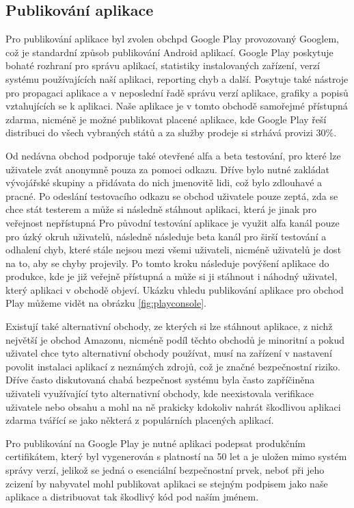 \documentclass{article}
\begin{document}
\subsection{Publikování aplikace}
Pro publikování aplikace byl zvolen obchpd Google Play provozovaný Googlem, což je standardní způsob
publikování Android aplikací. Google Play poskytuje bohaté rozhraní pro správu aplikací, statistiky
instalovaných zařízení, verzí systému používajících naší aplikaci, reporting chyb a další. Posytuje také
nástroje pro propagaci aplikace a v neposlední řadě správu verzí aplikace, grafiky a popisů
vztahujících se k aplikaci. Naše aplikace je v tomto obchodě samořejmé přístupná zdarma, nicméně
je možné publikovat placené aplikace, kde Google Play řeší distribuci do všech vybraných států a za služby
prodeje si strhává provizi 30\%.

Od nedávna obchod podporuje také otevřené alfa a beta testování, pro které lze uživatele zvát anonymně
pouza za pomoci odkazu. Dříve bylo nutné zakládat vývojářské skupiny a přidávata do nich jmenovitě
lidi, což bylo zdlouhavé a pracné. Po odeslání testovacího odkazu se obchod uživatele pouze zeptá,
zda se chce stát testerem a může si následně stáhnout aplikaci, která je jinak pro veřejnost nepřístupná
Pro původní testování aplikace je využit alfa kanál pouze pro úzký okruh uživatelů, následně následuje beta
kanál pro širší testování a odhalení chyb, které stále nejsou mezi všemi uživateli, nicméně uživatelů je
dost na to, aby se chyby projevily. Po tomto kroku následuje povýšení aplikace do produkce, kde je již
veřejně přístupná a může si ji stáhnout i náhodný uživatel, který aplikaci v obchodě objeví. Ukázku
vhledu publikování aplikace pro obchod Play můžeme vidět na obrázku \ref{fig:playconsole}.

Existují také alternativní obchody, ze kterých si lze stáhnout aplikace, z nichž největší je obchod Amazonu,
nicméně podíl těchto obchodů je minoritní a pokud uživatel chce tyto alternativní obchody používat,
musí na zařízení v nastavení povolit instalaci aplikací z neznámých zdrojů, což je značné bezpečnostní
riziko. Dříve často diskutovaná chabá bezpečnost systému byla často zapříčiněna uživateli využívající
tyto alternativní obchody, kde neexistovala verifikace uživatele nebo obsahu a mohl na ně prakicky
kdokoliv nahrát škodlivou aplikaci zdarma tvářící se jako některá z populárních placených aplikací.

Pro publikování na Google Play je nutné aplikaci podepsat produkčním certifikátem, který byl
vygenerován s platností na 50 let a je uložen mimo systém správy verzí, jelikož se jedná o esenciální
bezpečnostní prvek, neboť při jeho zcizení by nabyvatel mohl publikovat aplikaci se stejným podpisem
jako naše aplikace a distribuovat tak škodlivý kód pod naším jménem.
\end{document}

